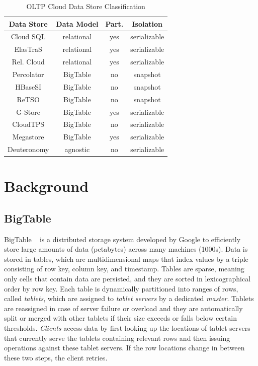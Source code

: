 \documentclass[10pt,final,journal]{IEEEtran}
\begin{document}
\begin{table}[!t]
\renewcommand{\arraystretch}{1.3}
\caption{OLTP Cloud Data Store Classification}
\label{classification}
\centering
\begin{tabular}{|c|c|c|c|}
\hline
\bfseries Data Store  & \bfseries Data Model & \bfseries  Part. & \bfseries Isolation \\
\hline
\hline
Cloud SQL & relational & yes & serializable \\
ElasTraS & relational & yes & serializable \\
Rel. Cloud & relational & yes & serializable \\
Percolator & BigTable & no & snapshot \\
HBaseSI & BigTable & no & snapshot \\
ReTSO & BigTable & no & snapshot \\
G-Store & BigTable & yes & serializable \\
CloudTPS & BigTable & no & serializable \\
Megastore & BigTable & yes & serializable \\
Deuteronomy & agnostic & no &serializable \\

\hline
\end{tabular}
\end{table}



\section{Background}

\subsection{BigTable}
BigTable ~\cite{Chang:2006:BDS:1267308.1267323} is a distributed storage system developed by Google to efficiently store large amounts of data (petabytes) across many machines (1000s). Data is stored in tables, which are multidimensional maps that index values by a triple consisting of row key, column key, and timestamp. Tables are sparse, meaning only cells that contain data are persisted, and they are sorted in lexicographical order by row key. Each table is dynamically partitioned into ranges of rows, called \emph{tablets}, which are assigned to \emph{tablet servers} by a dedicated \emph{master}. Tablets are reassigned in case of server failure or overload and they are automatically split or merged with other tablets if their size exceeds or falls below certain thresholds. \emph{Clients } access data by first looking up the locations of tablet servers that currently serve the tablets containing relevant rows and then issuing operations against these tablet servers. If the row locations change in between these two steps, the client retries.
\end{document}
